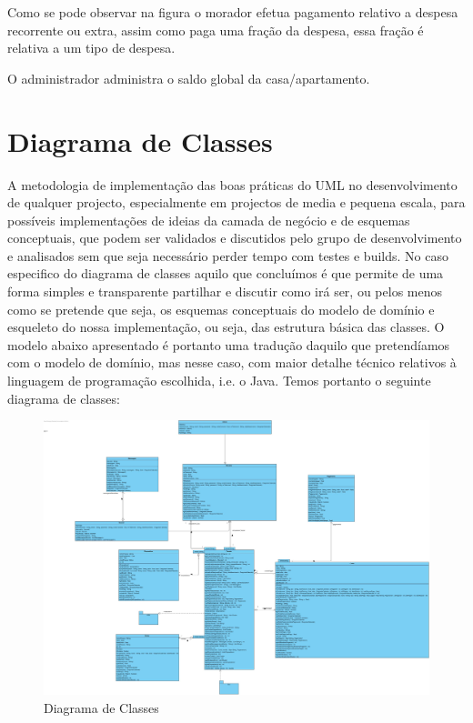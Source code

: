 Como se pode observar na figura o morador efetua pagamento relativo a despesa recorrente ou extra, assim como paga uma fração da despesa, essa fração é relativa a um tipo de despesa. 


O administrador administra o saldo global da casa/apartamento. 


\newpage

\section{Diagrama de Classes}
A metodologia de implementação das boas práticas do UML no desenvolvimento de qualquer
projecto, especialmente em projectos de media e pequena escala, para possíveis implementações de ideias da camada de negócio e de esquemas conceptuais, que podem ser validados e discutidos pelo grupo de desenvolvimento e analisados sem que seja necessário perder tempo com testes e builds.
No caso especifico do diagrama de classes aquilo que concluímos é que permite de uma forma simples e transparente partilhar e discutir como irá ser, ou pelos menos como se pretende que seja, os esquemas
conceptuais do modelo de domínio e esqueleto do nossa implementação, ou seja, das estrutura básica das classes. O modelo abaixo apresentado é portanto uma tradução daquilo que pretendíamos com o
modelo de domínio, mas nesse caso, com maior detalhe técnico relativos à linguagem de programação escolhida, i.e. o Java. Temos portanto o seguinte diagrama de classes:

\begin{figure}[htb!]
	\centering
	\includegraphics[scale=0.2]{imagens/diagramaClasses/DiagramaClasse}  
	\caption{Diagrama de Classes }  
\end{figure}



